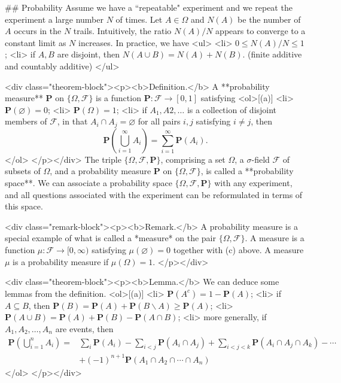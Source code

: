 ## Probability
Assume we have a ``repeatable" experiment and we repeat the experiment a large number $N$ of times. Let $A \in \Omega$ and $N(A)$ be the number of $A$ occurs in the $N$ trails. Intuitively, the ratio $N(A)/ N$ appears to converge to a constant limit as $N$ increases. In practice, we have 
<ul>
    <li> $0 \leq N(A)/ N \leq 1$;
    <li> if $A, B$ are disjoint, then $N(A \cup B) = N(A) + N(B)$. (finite additive and countably additive)
</ul>

<div class="theorem-block"><p><b>Definition.</b> 
A **probability measure** $\mathbf{P}$ on $\{ \Omega, \mathcal{F} \}$ is a function $\mathbf{P} : \mathcal{F} \to [0,1]$ satisfying
<ol>[(a)]
    <li> $\mathbf{P}(\varnothing) = 0$;
    <li> $\mathbf{P}(\Omega) = 1$;
    <li>  if $A_1, A2, \dots$ is a collection of disjoint members of $\mathcal{F}$, in that $A_i \cap A_j = \varnothing$ for all pairs $i, j$ satisfying $i \neq j$, then
    $$\begin{equation}
        \mathbf{P}\left( \bigcup_{i=1}^\infty A_i \right) = \sum_{i=1}^\infty \mathbf{P} (A_i).
    \end{equation}$$
</ol>
</p></div>
The triple $\{ \Omega, \mathcal{F}, \mathbf{P} \}$, comprising a set $\Omega$, a $\sigma$-field $\mathcal{F}$ of subsets of $\Omega$, and a probability measure $\mathbf{P}$ on $\{\Omega, \mathcal{F}\}$, is called a **probability space**. We can associate a probability space $\{ \Omega, \mathcal{F}, \mathbf{P} \}$ with any experiment, and all questions associated with the experiment can be reformulated in terms of this space. 

<div class="remark-block"><p><b>Remark.</b> 
A probability measure is a special example of what is called a *measure* on the pair $\{\Omega, \mathcal{F}\}$. A measure is a function $\mu: \mathcal{F} \to [0, \infty)$ satisfying $\mu(\varnothing) = 0$ together with (c) above. A measure $\mu$ is a probability measure if $\mu(\Omega) = 1$. 
</p></div>

<div class="theorem-block"><p><b>Lemma.</b> 
We can deduce some lemmas from the definition.
<ol>[(a)]
    <li> $\mathbf{P}(A^c) = 1 - \mathbf{P}(A)$;
    <li> if $A \subseteq B$, then $\mathbf{P}(B) = \mathbf{P}(A) + \mathbf{P}(B\backslash A) \geq \mathbf{P}(A)$;
    <li> $\mathbf{P}(A \cup B) = \mathbf{P}(A) + \mathbf{P}(B) - \mathbf{P}(A \cap B)$;
    <li> more generally, if $A_1, A_2, \dots, A_n$ are events, then 
    $$\begin{equation}
        \begin{split}
        \mathbf{P}\left( \bigcup_{i=1}^n A_i \right) =& \sum_{i}\mathbf{P}(A_i) - \sum_{i < j} \mathbf{P}(A_i \cap A_j) + \sum_{i<j<k} \mathbf{P}(A_i \cap A_j \cap A_k) - \cdots \\
        & +(-1)^{n+1} \mathbf{P}(A_1 \cap A_2 \cap \cdots \cap A_n)
        \end{split}
    \end{equation}$$
</ol>
</p></div>

